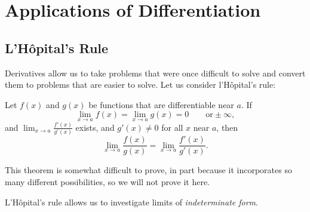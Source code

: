 \chapter{Applications of Differentiation}



\section{L'H\^{o}pital's Rule}


Derivatives allow us to take problems that were once difficult to
solve and convert them to problems that are easier to solve. Let us
consider l'H\^{o}pital's rule:

\begin{mainTheorem} 
Let $f(x)$ and $g(x)$ be functions that are differentiable near $a$.  If
\[
\lim_{x \to a} f(x) = \lim_{x \to a}g(x) = 0 \qquad \text{or} \pm \infty,
\]
and $\lim_{x \to a} \frac{f'(x)}{g'(x)}$ exists, and $g'(x) \neq 0$
for all $x$ near $a$, then 
\[
\lim_{x \to a} \frac{f(x)}{g(x)} = \lim_{x \to a} \frac{f'(x)}{g'(x)}.
\]
\end{mainTheorem}
This theorem is somewhat difficult to prove, in part because it
incorporates so many different possibilities, so we will not prove it
here. 

\break

L'H\^{o}pital's rule allows us to investigate limits of
\textit{indeterminate form}.

